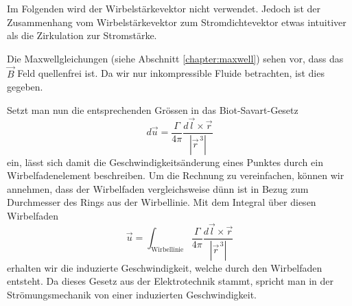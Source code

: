 Im Folgenden wird der Wirbelstärkevektor nicht verwendet.
Jedoch ist der Zusammenhang vom Wirbelstärkevektor zum Stromdichtevektor etwas intuitiver als die Zirkulation zur Stromstärke.

Die Maxwellgleichungen (siehe Abschnitt \ref{chapter:maxwell}) sehen vor, dass das \(\vec{B}\) Feld quellenfrei ist. 
Da wir nur inkompressible Fluide betrachten, ist dies gegeben.

Setzt man nun die entsprechenden Grössen in das Biot-Savart-Gesetz
\[
d\vec{u}
=
\frac{\Gamma}{4\pi}\frac{d\vec{l} \times \vec{r}}{\left\lvert \vec{r}^{\,3}\right\rvert }
\]
ein, lässt sich damit die Geschwindigkeitsänderung eines Punktes durch ein Wirbelfadenelement beschreiben.
Um die Rechnung zu vereinfachen, können wir annehmen, dass der Wirbelfaden vergleichsweise dünn ist in Bezug zum Durchmesser des Rings aus der Wirbellinie.
Mit dem Integral über diesen Wirbelfaden
\begin{equation}
    \label{Wirbelringe:eq:WirbelSpeed}
    \vec{u}
    =
    \int_{\text{Wirbellinie}} \frac{\Gamma}{4\pi}\frac{d\vec{l} \times \vec{r}}{\left\lvert \vec{r}^{\,3}\right\rvert}
\end{equation}
erhalten wir die induzierte Geschwindigkeit, welche durch den Wirbelfaden entsteht.
Da dieses Gesetz aus der Elektrotechnik stammt, spricht man in der Strömungsmechanik von einer induzierten Geschwindigkeit.

